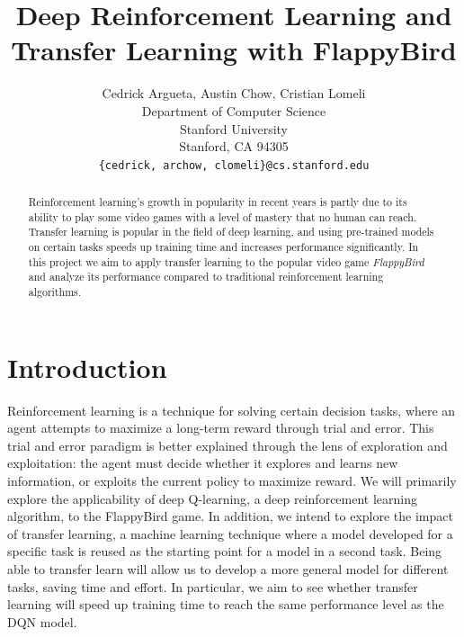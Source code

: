 \documentclass{article}
\title{Deep Reinforcement Learning and Transfer Learning with FlappyBird}
\author{
  Cedrick Argueta, Austin Chow, Cristian Lomeli \\
  Department of Computer Science\\
  Stanford University\\
  Stanford, CA 94305 \\
  \texttt{\{cedrick, archow, clomeli\}@cs.stanford.edu} \\
}
\begin{document}

\maketitle

\begin{abstract}

Reinforcement learning's growth in popularity in recent years is partly due to its ability to play some video games with a level of mastery that no human can reach. 
Transfer learning is popular in the field of deep learning, and using pre-trained models on certain tasks speeds up training time and increases performance significantly. 
In this project we aim to apply transfer learning to the popular video game \textit{FlappyBird} and analyze its performance compared to traditional reinforcement learning algorithms.
 
\end{abstract}


\section{Introduction}
Reinforcement learning is a technique for solving certain decision tasks, where an agent attempts to maximize a long-term reward through trial and error. 
This trial and error paradigm is better explained through the lens of exploration and exploitation: the agent must decide whether it explores and learns new information, or exploits the current policy to maximize reward.
We will primarily explore the applicability of deep Q-learning, a deep reinforcement learning algorithm, to the FlappyBird game.
In addition, we intend to explore the impact of transfer learning, a machine learning technique where a model developed for a specific task is reused as the starting point for a model in a second task. 
Being able to transfer learn will allow us to develop a more general model for different tasks, saving time and effort.
In particular, we aim to see whether transfer learning will speed up training time to reach the same performance level as the DQN model.
\end{document}
